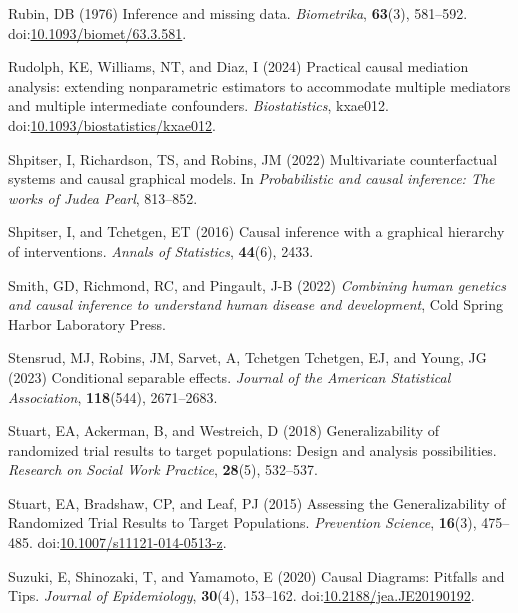 \documentclass[
  single column]{article}
\newlength{\cslhangindent}
\newenvironment{CSLReferences}[2] %
 {\begin{list}{}{%
  \setlength{\itemindent}{0pt}
  \setlength{\leftmargin}{0pt}
  \setlength{\parsep}{0pt}
  \ifodd #1
   \setlength{\leftmargin}{\cslhangindent}
   \setlength{\itemindent}{-1\cslhangindent}
  \fi
  \setlength{\itemsep}{#2\baselineskip}}}
 {\end{list}}
\begin{document}
\begin{CSLReferences}{1}{0}
Rubin, DB (1976) Inference and missing data. \emph{Biometrika},
\textbf{63}(3), 581--592.
doi:\href{https://doi.org/10.1093/biomet/63.3.581}{10.1093/biomet/63.3.581}.

Rudolph, KE, Williams, NT, and Diaz, I (2024) {Practical causal
mediation analysis: extending nonparametric estimators to accommodate
multiple mediators and multiple intermediate confounders}.
\emph{Biostatistics}, kxae012.
doi:\href{https://doi.org/10.1093/biostatistics/kxae012}{10.1093/biostatistics/kxae012}.

Shpitser, I, Richardson, TS, and Robins, JM (2022) Multivariate
counterfactual systems and causal graphical models. In
\emph{Probabilistic and causal inference: The works of {J}udea {P}earl},
813--852.

Shpitser, I, and Tchetgen, ET (2016) Causal inference with a graphical
hierarchy of interventions. \emph{Annals of Statistics}, \textbf{44}(6),
2433.

Smith, GD, Richmond, RC, and Pingault, J-B (2022) \emph{Combining human
genetics and causal inference to understand human disease and
development}, Cold Spring Harbor Laboratory Press.

Stensrud, MJ, Robins, JM, Sarvet, A, Tchetgen Tchetgen, EJ, and Young,
JG (2023) Conditional separable effects. \emph{Journal of the American
Statistical Association}, \textbf{118}(544), 2671--2683.

Stuart, EA, Ackerman, B, and Westreich, D (2018) Generalizability of
randomized trial results to target populations: Design and analysis
possibilities. \emph{Research on Social Work Practice}, \textbf{28}(5),
532--537.

Stuart, EA, Bradshaw, CP, and Leaf, PJ (2015) Assessing the
Generalizability of Randomized Trial Results to Target Populations.
\emph{Prevention Science}, \textbf{16}(3), 475--485.
doi:\href{https://doi.org/10.1007/s11121-014-0513-z}{10.1007/s11121-014-0513-z}.

Suzuki, E, Shinozaki, T, and Yamamoto, E (2020) Causal Diagrams:
Pitfalls and Tips. \emph{Journal of Epidemiology}, \textbf{30}(4),
153--162.
doi:\href{https://doi.org/10.2188/jea.JE20190192}{10.2188/jea.JE20190192}.


\end{CSLReferences}
\end{document}
